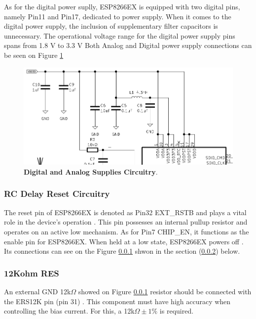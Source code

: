 As for the digital power suplly, ESP8266EX is equipped with two digital pins, namely Pin11 and Pin17, 
dedicated to power supply. When it comes to the digital power supply, the inclusion of supplementary filter capacitors 
is unnecessary. The operational voltage range for the digital power supply pins spans from 1.8 V to 3.3 V \cite{ESP8266HGL}
Both Analog and Digital power supply connections can be seen on Figure \ref{02fig:analogAndDigitalSupplies1}

\begin{figure}[H]
    \centering
    \includegraphics[scale = 0.775]{imagens/analogAndDigitalSupplies.png}
    \caption{\textbf{Digital and Analog Supplies Circuitry}.}
    \label{02fig:analogAndDigitalSupplies1}
\end{figure}



\subsubsection{RC Delay Reset Circuitry}\label{02SubSub:RCDelayResetCircuitry}


The reset pin of ESP8266EX is denoted as Pin32 EXT\_RSTB and plays a vital role in the device's 
operation \cite{ESP8266HGL}. This pin possesses an internal pullup resistor and operates on an active low mechanism. 
As for Pin7 CHIP\_EN, it functions as the enable pin for ESP8266EX. When held at a low state, ESP8266EX powers 
off \cite{ESP8266HGL}.  
Its connections can see on the Figure \ref{02SubSub:RCDelayResetCircuitry}
shwon in the section (\ref{02SubSub:12kOhmRes}) below.


\subsubsection{12Kohm RES}\label{02SubSub:12kOhmRes}

An external GND 12k$\Omega$ showed on Figure \ref{02SubSub:RCDelayResetCircuitry} resistor should be connected with the ERS12K pin 
(pin 31) \cite{ESP8266HGL}. This component must have high accuracy when controlling the bias current. For this,
a 12k$\Omega \pm 1\%$ is required.


